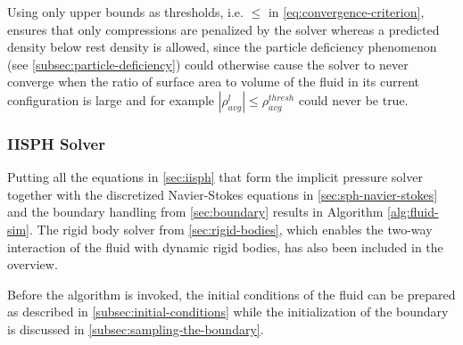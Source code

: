 \documentclass[oneside, a4paper]{book}
\newcommand\abs[1]{\left|#1\right|}
\begin{document}
  Using only upper bounds as thresholds, i.e. $\leq$ in \autoref{eq:convergence-criterion}, ensures that only compressions are penalized by the solver whereas a predicted density below rest density is allowed, since the particle deficiency phenomenon (see \autoref{subsec:particle-deficiency}) could otherwise cause the solver to never converge when the ratio of surface area to volume of the fluid in its current configuration is large and for example $\abs{\rho^l_{avg}} \leq \rho^{thresh}_{avg}$ could never be true. 


  \subsubsection{IISPH Solver}\label{subsec:iisph-solver}
  Putting all the equations in \autoref{sec:iisph} that form the implicit pressure solver together with the discretized Navier-Stokes equations in \autoref{sec:sph-navier-stokes} and the boundary handling from \autoref{sec:boundary} results in Algorithm \ref{alg:fluid-sim}. 
  The rigid body solver from \autoref{sec:rigid-bodies}, which enables the two-way interaction of the fluid with dynamic rigid bodies, has also been included in the overview.

  Before the algorithm is invoked, the initial conditions of the fluid can be prepared as described in \autoref{subsec:initial-conditions} while the initialization of the boundary is discussed in \autoref{subsec:sampling-the-boundary}.
\end{document}
